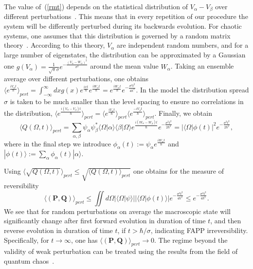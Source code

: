 \documentclass[12pt]{article}
\begin{document}
The value of~(\ref{rmt}) depends on the statistical distribution of $V_\alpha-V_\beta$ over different perturbations~\cite{peres3}. This means that in every repetition of our procedure the system will be differently perturbed during its backwards evolution. For chaotic systems, one assumes that this distribution is governed by a random matrix theory~\cite{chaos}. According to this theory,  $V_\alpha$ are independent random numbers, and for a large number of eigenstates, the distribution can be approximated by a Gaussian one $g(V_\alpha)=\frac{1}{\sqrt{\pi}\sigma} e^{-\frac{(V_\alpha-W_\alpha)^2}{\sigma^2}}$ around the mean value $W_\alpha$. Taking an ensemble average over different perturbations, one obtains $\langle e^{\frac{iV_\alpha t}{\hbar}} \rangle_{pert} = \int^\infty_{-\infty} dx g(x) e^{\frac{ixt}{\hbar}} e^{\frac{iW_\alpha t}{\hbar}} = e^{\frac{iW_\alpha t}{\hbar}} e^{-\frac{\sigma^2 t^2}{4\hbar^2}}$. In the model the distribution spread $\sigma$ is taken to be much smaller than the level spacing to ensure no correlations in the distribution, $\langle e^{\frac{i(V_\alpha-V_\beta) t}{\hbar}} \rangle_{pert} = \langle e^{\frac{iV_\alpha t}{\hbar}} \rangle_{pert}\langle e^{\frac{-iV_\beta t}{\hbar}} \rangle_{pert}$. Finally, we obtain
\begin{equation}
\langle Q(\Omega,t) \rangle_{pert}= \sum_{\alpha,\beta} \psi_\alpha \psi^{*}_\beta \langle \Omega |\alpha  \rangle \langle \beta|\Omega \rangle e^{\frac{i (W_\alpha - W_\beta) t}{\hbar}}e^{-\frac{\sigma^2 t^2}{2\hbar^2}}=|\langle\Omega|\phi(t)|^2 e^{-\frac{\sigma^2 t^2}{2\hbar^2}}, 
\end{equation}
where in the final step we introduce $\phi_\alpha (t):= \psi_\alpha e^{\frac{iW_\alpha t}{\hbar}}$ and $ |\phi(t)\rangle:=\sum_\alpha \phi_\alpha(t) |\alpha\rangle$.

Using $\langle \sqrt{Q(\Omega,t)} \rangle_{pert} \leq \sqrt{\langle Q(\Omega,t) \rangle_{pert}}$ one obtains for the measure of reversibility
\begin{equation}
\langle({\mathbf P},{\mathbf Q})\rangle_{pert} \leq \iint d\Omega 
|\langle \Omega |\psi\rangle| |\langle \Omega| \phi (t) \rangle| e^{-\frac{\sigma^2 t^2}{4\hbar^2}} \leq e^{-\frac{\sigma^2 t^2}{4\hbar^2}}.
\end{equation}
We see that for random perturbations on average the macroscopic state will significantly change after first forward evolution in duration of time $t$, and then reverse evolution in duration of time $t$, if $t > \hbar/\sigma$, indicating FAPP irreversibility. Specifically, for $t\rightarrow \infty$, one has $\langle({\mathbf P},{\mathbf Q})\rangle_{pert} \rightarrow 0$. The regime beyond the validity of weak perturbation can be treated using the results from the field of quantum chaos~\cite{jacquod}.
\end{document}
